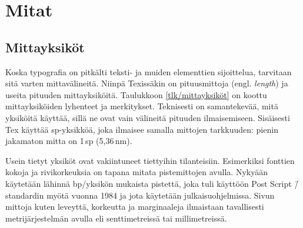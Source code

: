 \section{Mitat}
\label{luku/mitat}

\subsection{Mittayksiköt}

Koska typografia on pitkälti teksti- ja muiden elementtien sijoittelua,
tarvitaan sitä varten mittavälineitä. Niinpä Texissäkin on pituusmittoja
(engl. \emph{length}) ja useita pituuden mittayksiköitä. Taulukkoon
\ref{tlk/mittayksiköt} on koottu mittayksiköiden lyhenteet ja
merkitykset. Teknisesti on samantekevää, mitä yksiköitä käyttää, sillä
ne ovat vain välineitä pituuden ilmaisemiseen. Sisäisesti Tex käyttää
sp-yksikköä, joka ilmaisee samalla mittojen tarkkuuden: pienin jakamaton
mitta on 1\,sp (5,36\,nm).


Usein tietyt yksiköt ovat vakiintuneet tiettyihin tilanteisiin.
Esimerkiksi fonttien kokoja ja rivikorkeuksia on tapana mitata
pistemittojen avulla. Nykyään käytetään lähinnä bp\-/yksikön mukaista
pistettä, joka tuli käyttöön Post Script \=/standardin myötä vuonna 1984
ja jota käytetään julkaisuohjelmissa. Sivun mittoja kuten leveyttä,
korkeutta ja marginaaleja ilmaistaan tavallisesti metrijärjestelmän
avulla eli senttimetreissä tai millimetreissä.


